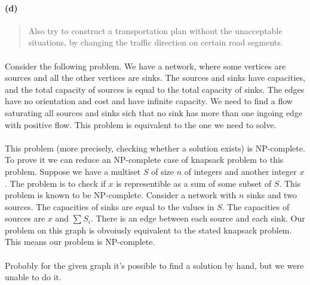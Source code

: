 \paragraph{(d)}
\begin{quote}
Also try to construct a transportation plan without the unacceptable situations, by changing the traffic direction on certain road segments.
\end{quote}

\paragraph{}
Consider the following problem. We have a network, where some vertices are sources and all the other vertices are sinks. The sources and sinks have capacities, and the total capacity of sources is equal to the total capacity of sinks. The edges have no orientation and cost and have infinite capacity. We need to find a flow saturating all sources and sinks sich that no sink has more than one ingoing edge with positive flow. This problem is equivalent to the one we need to solve.

\paragraph{}
This problem (more precisely, checking whether a solution exists) is NP-complete. To prove it we can reduce an NP-complete case of knapsack problem to this problem. Suppose we have a multiset $S$ of size $n$ of integers and another integer $x$. The problem is to check if $x$ is representible as a sum of some subset of $S$. This problem is known to be NP-complete. Consider a network with $n$ sinks and two sources. The capacities of sinks are equal to the values in $S$. The capacities of sources are $x$ and $\sum S_i$. There is an edge between each source and each sink. Our problem on this graph is obvoiusly equivalent to the stated knapsack problem. This means our problem is NP-complete.

\paragraph{}
Probably for the given graph it's possible to find a solution by hand, but we were unable to do it.
